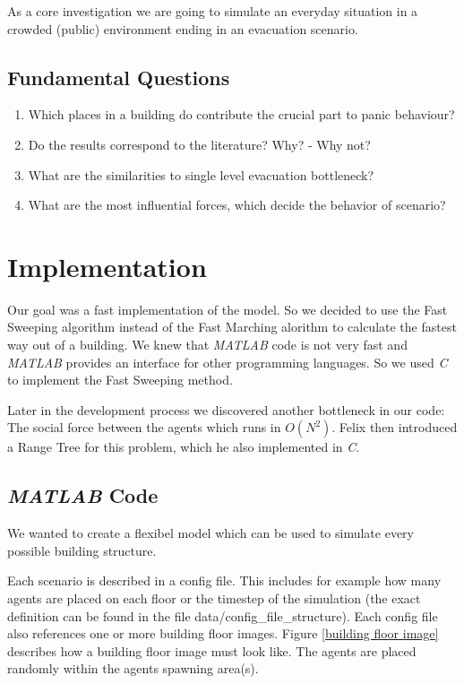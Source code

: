 \documentclass[11pt]{article}
\begin{document}
As a core investigation we are going to simulate an everyday situation in a crowded (public) environment ending in an evacuation scenario.

\subsection{Fundamental Questions}

\begin{enumerate}
\item Which places in a building do contribute the crucial part to panic behaviour?
\item Do the results correspond to the literature? Why? - Why not?
\item What are the similarities to single level evacuation bottleneck?
\item What are the most influential forces, which decide the behavior of scenario?

 
\end{enumerate}





\section{Implementation}
Our goal was a fast implementation of the model. So we decided to use the Fast
Sweeping algorithm instead of the Fast Marching alorithm to calculate the
fastest way out of a building. We knew that \textit{MATLAB} code is not very fast and
\textit{MATLAB} provides an interface for other programming languages. So we
used \textit{C} to
implement the Fast Sweeping method.

Later in the development process we discovered another bottleneck in our code:
The social force between the agents which runs in $ O(N^2) $. Felix then
introduced a Range Tree for this problem, which he also implemented in
\textit{C}.

\subsection{\textit{MATLAB} Code}
We wanted to create a flexibel model which can be used to simulate every
possible building structure. 

Each scenario is described in a config file. This includes for example how many
agents are placed on each floor or the timestep of the simulation (the exact
definition can be found in the file data/config\_file\_structure). Each config
file also references one or more building floor images.
Figure \vref{building floor image} describes how a building floor
image must look like. The agents are placed randomly within the agents spawning
area(s).
\end{document}
